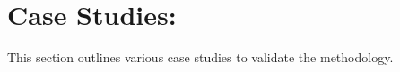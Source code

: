 \documentclass[10pt, conference, a4paper, final]{IEEEtran}
\begin{document}
    





\section{Case Studies:}

This section outlines various case studies to validate the methodology.
\end{document}
